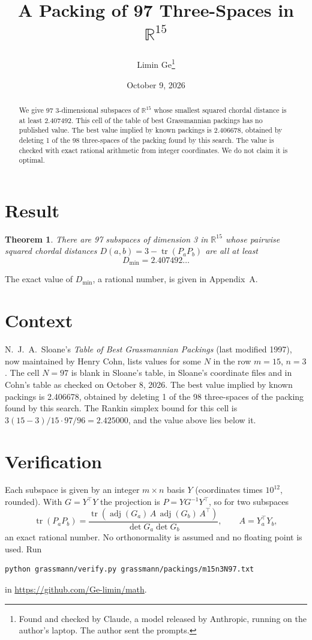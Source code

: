 \documentclass[11pt,a4paper]{article}
\title{A Packing of 97 Three-Spaces in $\mathbb{R}^{15}$}
\author{Limin Ge\thanks{Found and checked by Claude, a model released by Anthropic, running on the author's laptop. The author sent the prompts.}}
\date{October 9, 2026}
\newtheorem*{theorem}{Theorem}
\begin{document}
\maketitle
\begin{abstract}
We give 97 3-dimensional subspaces of $\mathbb{R}^{15}$ whose smallest squared chordal distance is at least 2.407492. This cell of the table of best Grassmannian packings has no published value. The best value implied by known packings is 2.406678, obtained by deleting 1 of the 98 three-spaces of the packing found by this search. The value is checked with exact rational arithmetic from integer coordinates. We do not claim it is optimal.
\end{abstract}

\section{Result}
\begin{theorem}
There are 97 subspaces of dimension 3 in $\mathbb{R}^{15}$ whose pairwise squared chordal distances $D(a,b) = 3 - \operatorname{tr}(P_aP_b)$ are all at least
\[ D_{\min} = 2.407492\ldots \]
\end{theorem}
The exact value of $D_{\min}$, a rational number, is given in Appendix~A.


\section{Context}
N.~J.~A.~Sloane's \emph{Table of Best Grassmannian Packings} (last modified 1997), now maintained by Henry Cohn, lists values for some $N$ in the row $m=15$, $n=3$. The cell $N=97$ is blank in Sloane's table, in Sloane's coordinate files and in Cohn's table as checked on October 8, 2026. The best value implied by known packings is 2.406678, obtained by deleting 1 of the 98 three-spaces of the packing found by this search. The Rankin simplex bound for this cell is $3(15-3)/15\cdot 97/96 = 2.425000$, and the value above lies below it.


\section{Verification}
Each subspace is given by an integer $m\times n$ basis $Y$ (coordinates times $10^{12}$, rounded). With $G=Y^\top Y$ the projection is $P=YG^{-1}Y^\top$, so for two subspaces
\[ \operatorname{tr}(P_aP_b)=\frac{\operatorname{tr}(\operatorname{adj}(G_a)\,A\,\operatorname{adj}(G_b)\,A^\top)}{\det G_a\det G_b},\qquad A=Y_a^\top Y_b, \]
an exact rational number. No orthonormality is assumed and no floating point is used. Run
\begin{verbatim}
python grassmann/verify.py grassmann/packings/m15n3N97.txt
\end{verbatim}
in \url{https://github.com/Ge-limin/math}.
\end{document}
